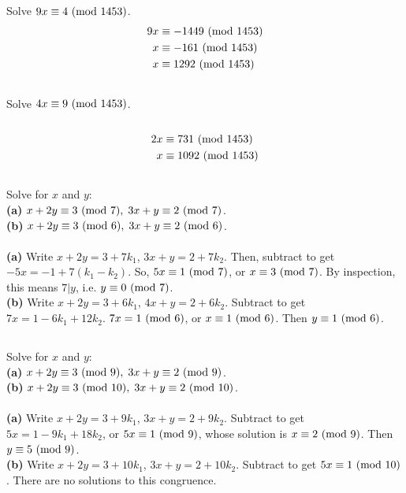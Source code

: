 \documentclass{article}
\begin{document}
\subsection{}
Solve $9x \equiv 4 \ (\mathrm{mod}\ 1453)$.
\begin{align*}
    9x &\equiv -1449 \ (\mathrm{mod}\ 1453)\\
    x &\equiv -161 \ (\mathrm{mod}\ 1453)\\
    x &\equiv 1292 \ (\mathrm{mod}\ 1453)
\end{align*}

\subsection{}
Solve $4x \equiv 9 \ (\mathrm{mod}\ 1453)$.\\~\\
\begin{align*}
    2x &\equiv 731 \ (\mathrm{mod}\ 1453)\\
    x &\equiv 1092 \ (\mathrm{mod}\ 1453)
\end{align*}

\subsection{}
Solve for $x$ and $y$:\\
\textbf{(a)} $x + 2y \equiv 3 \ (\mathrm{mod}\ 7), \; 3x + y \equiv 2 \ (\mathrm{mod}\ 7)$.\\
\textbf{(b)} $x + 2y \equiv 3 \ (\mathrm{mod}\ 6), \; 3x + y \equiv 2 \ (\mathrm{mod}\ 6)$.\\~\\
\textbf{(a)} Write $x + 2y = 3 + 7k_1$, $3x + y = 2 + 7k_2$.
Then, subtract to get $-5x = -1 + 7(k_1 - k_2)$.
So, $5x \equiv 1 \ (\mathrm{mod}\ 7)$, or $x \equiv 3 \ (\mathrm{mod}\ 7)$.
By inspection, this means $7|y$, i.e. $y \equiv 0 \ (\mathrm{mod}\ 7)$.\\
\textbf{(b)} Write $x + 2y = 3 + 6k_1$, $4x + y = 2 + 6k_2$.
Subtract to get $7x = 1 - 6k_1 + 12k_2$.
$7x = 1 \ (\mathrm{mod}\ 6)$, or $x \equiv 1 \ (\mathrm{mod}\ 6)$.
Then $y \equiv 1 \ (\mathrm{mod}\ 6)$.

\subsection{}
Solve for $x$ and $y$:\\
\textbf{(a)} $x + 2y \equiv 3 \ (\mathrm{mod}\ 9), \; 3x + y \equiv 2 \ (\mathrm{mod}\ 9)$.\\
\textbf{(b)} $x + 2y \equiv 3 \ (\mathrm{mod}\ 10), \; 3x + y \equiv 2 \ (\mathrm{mod}\ 10)$.\\~\\
\textbf{(a)} Write $x + 2y = 3 + 9k_1$, $3x + y = 2 + 9k_2$.
Subtract to get $5x = 1 - 9k_1 + 18k_2$, or $5x \equiv 1 \ (\mathrm{mod}\ 9)$,
whose solution is $x \equiv 2 \ (\mathrm{mod}\ 9)$.
Then $y \equiv 5 \ (\mathrm{mod}\ 9)$.\\
\textbf{(b)} Write $x + 2y = 3 + 10k_1$, $3x + y = 2 + 10k_2$.
Subtract to get $5x \equiv 1 \ (\mathrm{mod}\ 10)$.
There are no solutions to this congruence.
\end{document}
